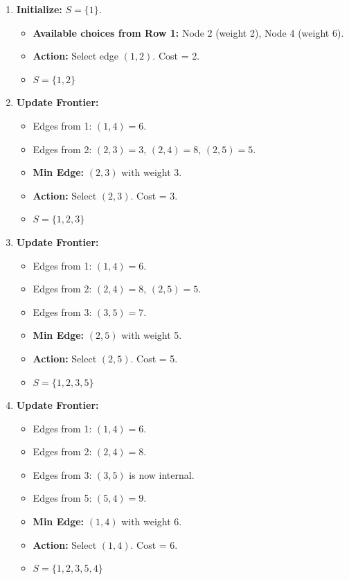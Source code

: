 \documentclass[
  letterpaper,
  DIV=11,
  numbers=noendperiod]{scrreprt}
\providecommand{\tightlist}{%
  \setlength{\itemsep}{0pt}\setlength{\parskip}{0pt}}
\begin{document}
\begin{enumerate}
\def\labelenumi{\arabic{enumi}.}
\tightlist
\item
  \textbf{Initialize:} \(S = \{1\}\).

  \begin{itemize}
  \tightlist
  \item
    \textbf{Available choices from Row 1:} Node 2 (weight 2), Node 4
    (weight 6).
  \item
    \textbf{Action:} Select edge \((1, 2)\). Cost = 2.
  \item
    \textbf{\(S = \{1, 2\}\)}
  \end{itemize}
\item
  \textbf{Update Frontier:}

  \begin{itemize}
  \tightlist
  \item
    Edges from 1: \((1, 4) = 6\).
  \item
    Edges from 2: \((2, 3) = 3\), \((2, 4) = 8\), \((2, 5) = 5\).
  \item
    \textbf{Min Edge:} \((2, 3)\) with weight 3.
  \item
    \textbf{Action:} Select \((2, 3)\). Cost = 3.
  \item
    \textbf{\(S = \{1, 2, 3\}\)}
  \end{itemize}
\item
  \textbf{Update Frontier:}

  \begin{itemize}
  \tightlist
  \item
    Edges from 1: \((1, 4) = 6\).
  \item
    Edges from 2: \((2, 4) = 8\), \((2, 5) = 5\).
  \item
    Edges from 3: \((3, 5) = 7\).
  \item
    \textbf{Min Edge:} \((2, 5)\) with weight 5.
  \item
    \textbf{Action:} Select \((2, 5)\). Cost = 5.
  \item
    \textbf{\(S = \{1, 2, 3, 5\}\)}
  \end{itemize}
\item
  \textbf{Update Frontier:}

  \begin{itemize}
  \tightlist
  \item
    Edges from 1: \((1, 4) = 6\).
  \item
    Edges from 2: \((2, 4) = 8\).
  \item
    Edges from 3: \((3, 5)\) is now internal.
  \item
    Edges from 5: \((5, 4) = 9\).
  \item
    \textbf{Min Edge:} \((1, 4)\) with weight 6.
  \item
    \textbf{Action:} Select \((1, 4)\). Cost = 6.
  \item
    \textbf{\(S = \{1, 2, 3, 5, 4\}\)}
  \end{itemize}
\end{enumerate}
\end{document}

